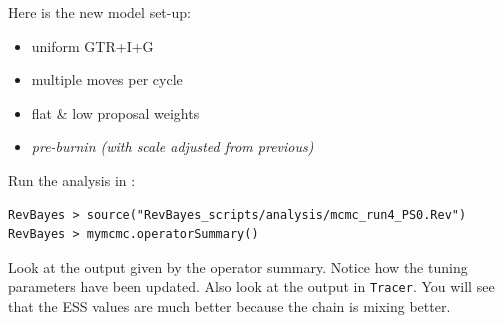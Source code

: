\documentclass[11pt]{article}
\begin{document}
Here is the new model set-up:
\begin{itemize}
\item{uniform GTR+I+G}
\item{multiple moves per cycle}
\item{flat \& low proposal weights}
\item{\it pre-burnin (with scale adjusted from previous)}
\end{itemize}
Run the analysis in \RevBayes:
{\tt \begin{snugshade*}
\begin{lstlisting}
RevBayes > source("RevBayes_scripts/analysis/mcmc_run4_PS0.Rev")
RevBayes > mymcmc.operatorSummary()
\end{lstlisting}
\end{snugshade*}}
Look at the output given by the operator summary.
Notice how the tuning parameters have been updated.
Also look at the output in \verb!Tracer!.
You will see that the ESS values are much better because the chain is mixing better.
\end{document}
